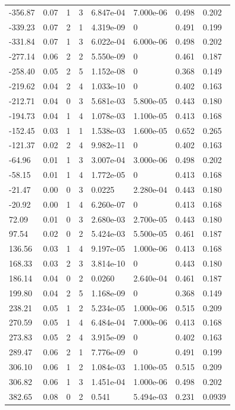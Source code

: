 \documentclass[preview]{standalone}
\begin{document}
{{\begin{tabular}{L{1.2cm}C{1.2cm} C{0.3cm}C{0.5cm} C{1.4cm}C{1.4cm} C{1.4cm}C{1.4cm}}
  -356.87  &  0.07  & 1     &  3 &  6.847e-04  & 7.000e-06  & 0.498 &  0.202   \\ 
  -339.23  &  0.07  & 2     &  1 &  4.319e-09  & 0  & 0.491 &  0.199   \\ 
  -331.84  &  0.07  & 1     &  3 &  6.022e-04  & 6.000e-06  & 0.498 &  0.202   \\ 
  -277.14  &  0.06  & 2     &  2 &  5.550e-09  & 0  & 0.461 &  0.187   \\ 
  -258.40  &  0.05  & 2     &  5 &  1.152e-08  & 0  & 0.368 &  0.149   \\ 
  -219.62  &  0.04  & 2     &  4 &  1.033e-10  & 0  & 0.402 &  0.163   \\ 
  -212.71  &  0.04  & 0     &  3 &  5.681e-03  & 5.800e-05  & 0.443 &  0.180   \\ 
  -194.73  &  0.04  & 1     &  4 &  1.078e-03  & 1.100e-05  & 0.413 &  0.168   \\ 
  -152.45  &  0.03  & 1     &  1 &  1.538e-03  & 1.600e-05  & 0.652 &  0.265   \\ 
  -121.37  &  0.02  & 2     &  4 &  9.982e-11  & 0  & 0.402 &  0.163   \\ 
  -64.96  &  0.01  & 1     &  3 &  3.007e-04  & 3.000e-06  & 0.498 &  0.202   \\ 
  -58.15  &  0.01  & 1     &  4 &  1.772e-05  & 0  & 0.413 &  0.168   \\ 
  -21.47  &  0.00  & 0     &  3 &  0.0225  & 2.280e-04  & 0.443 &  0.180   \\ 
  -20.92  &  0.00  & 1     &  4 &  6.260e-07  & 0  & 0.413 &  0.168   \\ 
  72.09  &  0.01  & 0     &  3 &  2.680e-03  & 2.700e-05  & 0.443 &  0.180   \\ 
  97.54  &  0.02  & 0     &  2 &  5.424e-03  & 5.500e-05  & 0.461 &  0.187   \\ 
  136.56  &  0.03  & 1     &  4 &  9.197e-05  & 1.000e-06  & 0.413 &  0.168   \\ 
  168.33  &  0.03  & 2     &  3 &  3.814e-10  & 0  & 0.443 &  0.180   \\ 
  186.14  &  0.04  & 0     &  2 &  0.0260  & 2.640e-04  & 0.461 &  0.187   \\ 
  199.80  &  0.04  & 2     &  5 &  1.168e-09  & 0  & 0.368 &  0.149   \\ 
  238.21  &  0.05  & 1     &  2 &  5.234e-05  & 1.000e-06  & 0.515 &  0.209   \\ 
  270.59  &  0.05  & 1     &  4 &  6.484e-04  & 7.000e-06  & 0.413 &  0.168   \\ 
  273.83  &  0.05  & 2     &  4 &  3.915e-09  & 0  & 0.402 &  0.163   \\ 
  289.47  &  0.06  & 2     &  1 &  7.776e-09  & 0  & 0.491 &  0.199   \\ 
  306.10  &  0.06  & 1     &  2 &  1.084e-03  & 1.100e-05  & 0.515 &  0.209   \\ 
  306.82  &  0.06  & 1     &  3 &  1.451e-04  & 1.000e-06  & 0.498 &  0.202   \\ 
  382.65  &  0.08  & 0     &  2 &  0.541  & 5.494e-03  & 0.231 &  0.0939   \\ 
\hline 
\end{tabular} 

}}
\end{document}
